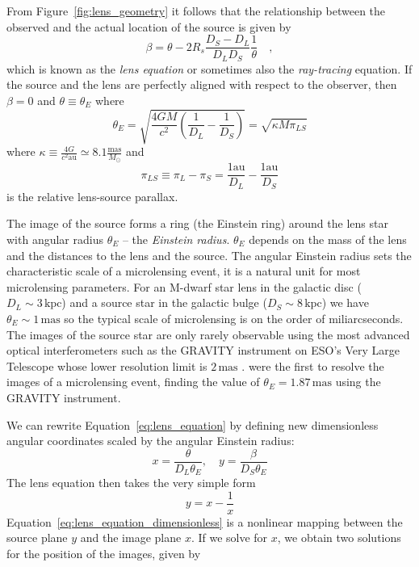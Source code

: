 \documentclass[12pt,dvipsnames]{report}
\begin{document}
From Figure~\ref{fig:lens_geometry} it follows that the relationship between
the observed and the actual location of the source is given by
\begin{equation}
    \beta=\theta-2 R_s \frac{D_S-D_L}{D_LD_S}
    \frac{1}{\theta}\quad,
    \label{eq:lens_equation}
\end{equation}
which is known as the \emph{lens equation} or sometimes also the \emph{ray-tracing}
equation. If the source and the lens are perfectly aligned with respect to the observer,
then $\beta=0$ and $\theta\equiv\theta_E$ where
\begin{equation}
    \theta_E= \sqrt{ \frac{4GM}{c^2} \left( \frac{1}{D_L} - \frac{1}{D_S} \right)}=
    \sqrt{\kappa M\pi_{LS}}
    \label{eq:angular_einstein_radius}
\end{equation}
where $\kappa \equiv \frac{4 G}{c^{2} \mathrm{au}} \simeq 8.1 \frac{\mathrm{mas}}{M_{\odot}}$
and
\begin{equation}
    \pi_{LS}\equiv\pi_L - \pi_S=\frac{1\mathrm{au}}{D_L}-\frac{1\mathrm{au}}{D_S}
\end{equation}
is the relative lens-source parallax.

The image of the source forms a ring (the Einstein ring) around the lens star
with angular radius $\theta_E$ -- the \emph{Einstein radius}. $\theta_E$
depends on the mass of the lens and the distances to the lens and the source.
The angular Einstein radius sets the characteristic scale of a microlensing
event, it is a natural unit for most microlensing parameters. For an M-dwarf
star lens in the galactic disc ($D_L\sim 3\,\textrm{kpc}$) and a source star in
the galactic bulge ($D_S\sim 8\,\textrm{kpc}$) we have $\theta_E\sim
    1\,\textrm{mas}$ so the typical scale of microlensing is on the order of
miliarcseconds. The images of the source star are only rarely observable using
the most advanced optical interferometers such as the GRAVITY instrument on
ESO's Very Large Telescope whose lower resolution limit is $2\,\textrm{mas}$
\citep{arXiv:1705.02345}. \cite{2019ApJ...871...70D} were the first to resolve
the images of a microlensing event, finding the value of
$\theta_E=1.87\,\textrm{mas}$ using the GRAVITY instrument.

We can rewrite Equation~\ref{eq:lens_equation} by defining new dimensionless
angular coordinates scaled by the angular Einstein radius:
\begin{equation}
    x= \frac{\theta}{D_L\theta_E}, \quad y=\frac{\beta}{D_S\theta_E}
\end{equation}
The lens equation then takes the very simple form
\begin{equation}
    y= x- \frac{ 1}{x}
    \label{eq:lens_equation_dimensionless}
\end{equation}
Equation~\ref{eq:lens_equation_dimensionless} is a nonlinear mapping between the
source plane $y$ and the image plane $x$.
If we solve for $x$, we obtain two solutions for the position of the images, given by
\end{document}
